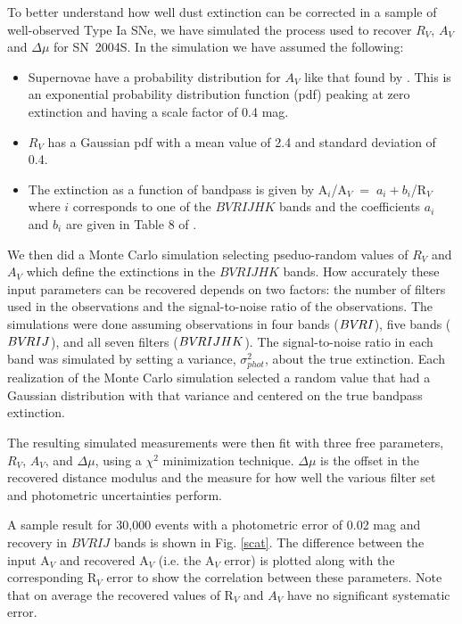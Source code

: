 \documentclass[12pt,preprint,psfig,epsf]{aastex}
\newcommand{\bvrij}{\protect\hbox{$BV\!RIJ$} }
\newcommand{\bvrijhk}{\protect\hbox{$BV\!RIJHK$} }
\begin{document}
To better understand how well dust extinction can be corrected
in a sample of well-observed Type Ia SNe, we have simulated the
process used to recover $R_V$, $A_V$ and $\Delta\mu$ for
SN~2004S. In the simulation we have assumed the following:
\begin{itemize}

\item Supernovae have a probability distribution for $A_V$ like
 that found by \citet{Jha_etal06b}. This is an exponential 
 probability distribution function (pdf) peaking at 
 zero extinction and having a scale factor of 0.4 mag.

\item $R_V$ has a Gaussian pdf with a mean value of 2.4 and
standard deviation of 0.4.

\item The extinction as a function of bandpass is given by
 A$_i$/A$_V \; =\; a_i + b_i$/R$_V$ where $i$ corresponds to one
of the \bvrijhk bands and the coefficients $a_i$ and $b_i$ are
given in Table 8 of \citet{Kri_etal06}.

\end{itemize}

We then did a Monte Carlo simulation selecting pseduo-random
values of $R_V$ and $A_V$ which define the extinctions in the
\bvrijhk bands. How accurately these input parameters can be 
recovered depends on two factors: the number of filters used
in the observations and the signal-to-noise ratio of the
observations. The simulations were done assuming observations
in four bands ($BV\hspace{-0.5mm}RI$), 
five bands ($BV\hspace{-0.5mm}RIJ$), and all seven
filters ($BV\hspace{-0.5mm}RIJHK$). The signal-to-noise ratio in each
band was simulated by setting a variance, $\sigma^2_{phot}$,   
about the true extinction. Each realization
of the Monte Carlo simulation selected a random value     
that had a Gaussian distribution with that variance and   
centered on the true bandpass extinction.

The resulting simulated measurements were then fit with three
free parameters, $R_V$, $A_V$, and $\Delta\mu$, using a $\chi^2$  
minimization technique. $\Delta\mu$ is the offset in the recovered
distance modulus and the measure for how well the various filter set
and photometric uncertainties perform.

A sample result for 30,000 events with a photometric error
of 0.02 mag and recovery in \bvrij bands is shown in Fig. \ref{scat}. The
difference between the input A$_V$ and recovered A$_V$ (i.e. the A$_V$ 
error) is plotted along with the corresponding
R$_V$ error to show the correlation between these parameters.  Note that
on average the recovered values of R$_V$ and $A_V$ have no significant 
systematic error.
\end{document}
